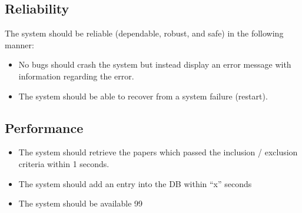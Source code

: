 \subsection{Reliability}

The system should be reliable (dependable, robust, and safe) in the following manner:

\begin{itemize}
\item No bugs should crash the system but instead display an error message with information regarding the error.
\item The system should be able to recover from a system failure (restart).
\end{itemize}


\subsection{Performance}

\begin{itemize}
\item The system should retrieve the papers which passed the inclusion / exclusion criteria within 1 seconds.
\item The system should add an entry into the DB within “x” seconds
\item The system should be available 99%
\end{itemize}

